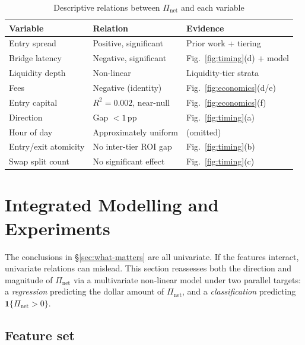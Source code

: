 \documentclass[sigconf,nonacm,10pt]{acmart}
\newcommand{\Pnet}{\Pi_{\text{net}}}
\begin{document}
\begin{table}[h]
  \centering
  \small
  \caption{Descriptive relations between $\Pnet$ and each variable}
  \label{tab:univar}
  \begin{tabular}{lll}
    \toprule
    \textbf{Variable} & \textbf{Relation} & \textbf{Evidence} \\
    \midrule
    Entry spread     & Positive, significant     & Prior work + tiering \\
    Bridge latency   & Negative, significant     & Fig.~\ref{fig:timing}(d) + model \\
    Liquidity depth  & Non-linear                & Liquidity-tier strata \\
    Fees             & Negative (identity)       & Fig.~\ref{fig:economics}(d/e) \\
    Entry capital    & $R^2\!=\!0.002$, near-null & Fig.~\ref{fig:economics}(f) \\
    Direction        & Gap $<\!1$\,pp             & Fig.~\ref{fig:timing}(a) \\
    Hour of day      & Approximately uniform     & (omitted) \\
    Entry/exit atomicity & No inter-tier ROI gap & Fig.~\ref{fig:timing}(b) \\
    Swap split count & No significant effect     & Fig.~\ref{fig:timing}(c) \\
    \bottomrule
  \end{tabular}
\end{table}

\section{Integrated Modelling and Experiments}
\label{sec:model}

The conclusions in \S\ref{sec:what-matters} are all univariate. If the
features interact, univariate relations can mislead. This section
reassesses both the direction and magnitude of $\Pnet$ via a
multivariate non-linear model under two parallel targets:
a \emph{regression} predicting the dollar amount of $\Pnet$, and a
\emph{classification} predicting $\mathbf{1}\{\Pnet>0\}$.

\subsection{Feature set}
\label{sec:features}
\end{document}
